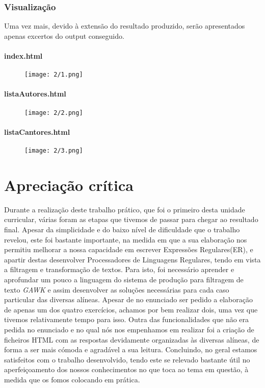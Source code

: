 \documentclass[12pt,a4paper]{report}
\begin{document}
\subsection{Visualização}
Uma vez mais, devido à extensão do resultado produzido, serão apresentados apenas excertos do output conseguido.

\subsubsection{index.html}
\begin{figure}[H]
\centering
\texttt{[image: 2/1.png]}
\end{figure}
\vspace{0.5cm}
\subsubsection{listaAutores.html}
\begin{figure}[H]
\centering
\texttt{[image: 2/2.png]}
\end{figure}
\vspace{0.5cm}
\subsubsection{listaCantores.html}
\begin{figure}[H]
\centering
\texttt{[image: 2/3.png]}
\end{figure}

\chapter{Apreciação crítica}
Durante a realização deste trabalho prático, que foi o primeiro desta unidade curricular, várias foram as etapas que tivemos de passar para chegar ao resultado final.
Apesar da simplicidade e do baixo nível de dificuldade que o trabalho revelou, este foi bastante importante, na medida em que a sua elaboração nos permitiu melhorar a nossa capacidade em escrever Expressões Regulares(ER), e apartir destas desenvolver Processadores de Linguagens Regulares, tendo em vista a filtragem e transformação de textos. Para isto, foi necessário aprender e aprofundar um pouco a linguagem do sistema de produção para filtragem de texto \emph{GAWK} e assim desenvolver as soluções necessárias para cada caso particular das diversas alíneas. 
Apesar de no enunciado ser pedido a elaboração de apenas um dos quatro exercícios, achamos por bem realizar dois, uma vez que tivemos relativamente tempo para isso. Outra das funcionalidades que não era pedida no enunciado e no qual nós nos empenhamos em realizar foi a criação de ficheiros HTML com as respostas devidamente organizadas às diversas alíneas, de forma a ser mais cómoda e agradável a sua leitura.
Concluindo, no geral estamos satisfeitos com o trabalho desenvolvido, tendo este se relevado bastante útil no aperfeiçoamento dos nossos conhecimentos no que toca ao tema em questão, à medida que os fomos colocando em prática.
\end{document}

